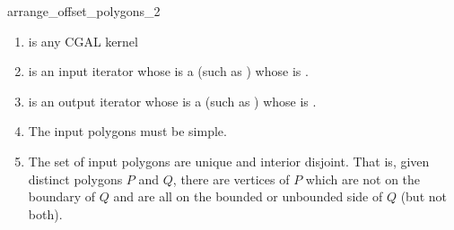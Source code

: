 \begin{ccRefFunction}{arrange_offset_polygons_2}
\begin{enumerate} 
   \item    {} is any CGAL kernel
   \item    {} is an input iterator whose  is a 
            (such as ) whose  is .
   \item    {} is an output iterator whose  is a 
            (such as ) whose  is .
   \item    The input polygons must be simple.
   \item    The set of input polygons are unique and interior disjoint. That is, given distinct polygons
            $P$ and $Q$, there are vertices of $P$ which are not on the boundary of $Q$ and are all on the
            bounded or unbounded side of $Q$ (but not both). 
\end{enumerate}


\ccSeeAlso
{}\\
 \\

\end{ccRefFunction}


